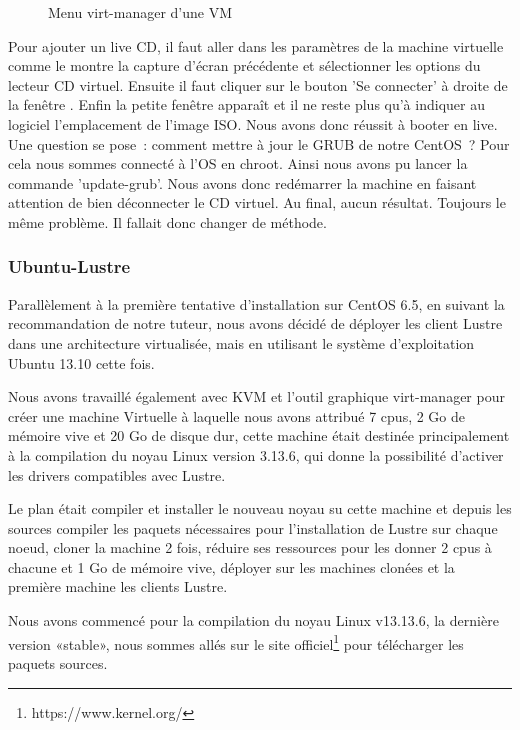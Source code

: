 \documentclass[12pt]{article}
\begin{document}
\begin{figure}[H]
\caption{Menu virt-manager d'une VM}
\label{fig:identification}
\end{figure}

Pour ajouter un live CD, il faut aller dans les paramètres de la machine virtuelle comme le montre la capture d'écran précédente et sélectionner les options du lecteur CD virtuel. Ensuite il faut cliquer sur le bouton 'Se connecter' à droite de la fenêtre . Enfin la petite fenêtre apparaît et il ne reste plus qu'à indiquer au logiciel l'emplacement de l'image ISO. Nous avons donc réussit à booter en live. Une question se pose : comment mettre à jour le GRUB de notre CentOS ? Pour cela nous sommes connecté à l'OS en chroot. Ainsi nous avons pu lancer la commande 'update-grub'. Nous avons donc redémarrer la machine en faisant attention de bien déconnecter le CD virtuel. Au final, aucun résultat. Toujours le même problème. Il fallait donc changer de méthode.

\newpage
\subsubsection{Ubuntu-Lustre}
Parallèlement à la première tentative d'installation sur CentOS 6.5, en suivant la recommandation de notre tuteur, nous avons décidé de déployer les client Lustre dans une architecture virtualisée, mais en utilisant le système d'exploitation Ubuntu 13.10 cette fois.

Nous avons travaillé également avec KVM et l'outil graphique virt-manager pour créer une machine Virtuelle à laquelle nous avons attribué 7 cpus, 2 Go de mémoire vive et 20 Go de disque dur, cette machine était destinée principalement à la compilation du noyau Linux version 3.13.6, qui donne la possibilité d'activer les drivers compatibles avec Lustre.

Le plan était compiler et installer le nouveau noyau su cette machine et depuis les sources compiler les paquets nécessaires pour l'installation de Lustre sur chaque noeud, cloner la machine 2 fois, réduire ses ressources pour les donner 2 cpus à chacune et 1 Go de mémoire vive, déployer sur les machines clonées et la première machine les clients Lustre.

Nous avons commencé pour la compilation du noyau Linux v13.13.6, la dernière version «stable», nous sommes allés sur le site officiel\footnote{https://www.kernel.org/} pour télécharger les paquets sources.
\end{document}
